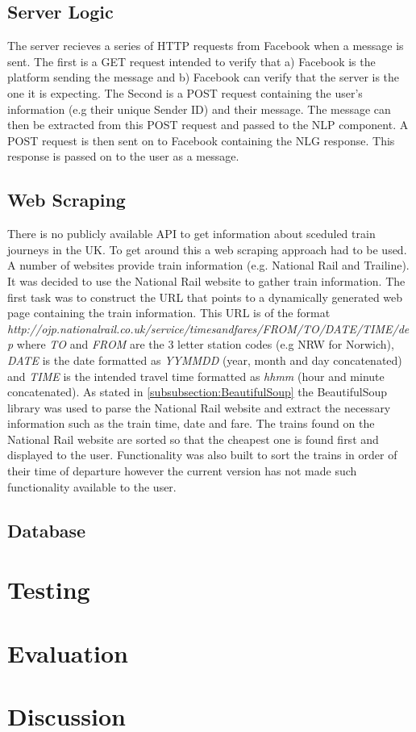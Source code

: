 \documentclass[12pt,a4paper]{article}
\begin{document}
    \subsection{Server Logic}
    The server recieves a series of HTTP requests from Facebook when a message is sent. The first is a GET request intended to verify that a) Facebook is the platform sending the message and b) Facebook can verify that the server is the one it is expecting. The Second is a POST request containing the user's information (e.g their unique Sender ID) and their message. The message can then be extracted from this POST request and passed to the NLP component. A POST request is then sent on to Facebook containing the NLG response. This response is passed on to the user as a message.
    
    \subsection{Web Scraping}
    There is no publicly available API to get information about sceduled train journeys in the UK. To get around this a web scraping approach had to be used. A number of websites provide train information (e.g. National Rail and Trailine). It was decided to use the National Rail website to gather train information. The first task was to construct the URL that points to a dynamically generated web page containing the train information. This URL is of the format
    \emph{http://ojp.nationalrail.co.uk/service/timesandfares/FROM/TO/DATE/TIME/dep} where \emph{TO} and \emph{FROM} are the 3 letter station codes (e.g NRW for Norwich), \emph{DATE} is the date formatted as \emph{YYMMDD} (year, month and day concatenated) and \emph{TIME} is the intended travel time formatted as \emph{hhmm} (hour and minute concatenated).
    As stated in \ref{subsubsection:BeautifulSoup} the BeautifulSoup library was used to parse the National Rail website and extract the necessary information such as the train time, date and fare. The trains found on the National Rail website are sorted so that the cheapest one is found first and displayed to the user. Functionality was also built to sort the trains in order of their time of departure however the current version has not made such functionality available to the user.
    
    \subsection{Database}
    
    
    \section{Testing}
    \section{Evaluation}
    \section{Discussion}
    
    
    
    
\end{document}
